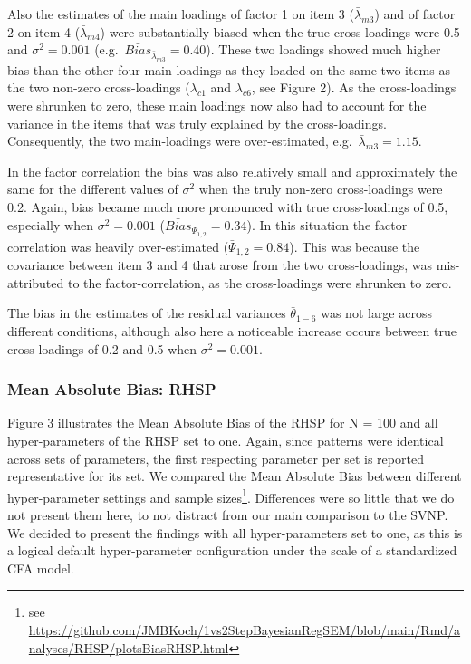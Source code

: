 \documentclass[
  english,
  man, donotrepeattitle,floatsintext]{apa6}
\begin{document}
Also the estimates of the main loadings of factor 1 on item 3 (\(\bar{\lambda}_{m 3}\)) and of factor 2 on item 4 (\(\bar{\lambda}_{m 4}\)) were substantially biased when the true cross-loadings were 0.5 and \(\sigma^2 = 0.001\) (e.g.~\(\bar{Bias}_{\bar{\lambda}_{m 3}} = 0.40\)). These two loadings showed much higher bias than the other four main-loadings as they loaded on the same two items as the two non-zero cross-loadings (\(\bar{\lambda}_{c 1}\) and \(\bar{\lambda}_{c 6}\), see Figure 2). As the cross-loadings were shrunken to zero, these main loadings now also had to account for the variance in the items that was truly explained by the cross-loadings. Consequently, the two main-loadings were over-estimated, e.g.~\(\bar{\lambda}_{m 3} = 1.15\).

In the factor correlation the bias was also relatively small and approximately the same for the different values of \(\sigma^2\) when the truly non-zero cross-loadings were 0.2. Again, bias became much more pronounced with true cross-loadings of 0.5, especially when \(\sigma^2 = 0.001\) (\(\bar{Bias}_{\bar{\Psi}_{1,2}} = 0.34\)). In this situation the factor correlation was heavily over-estimated (\(\bar{\Psi}_{1,2} = 0.84\)). This was because the covariance between item 3 and 4 that arose from the two cross-loadings, was mis-attributed to the factor-correlation, as the cross-loadings were shrunken to zero.

The bias in the estimates of the residual variances \(\bar{\theta}_{1-6}\) was not large across different conditions, although also here a noticeable increase occurs between true cross-loadings of 0.2 and 0.5 when \(\sigma^2 = 0.001\).

\hypertarget{mean-absolute-bias-rhsp}{%
\subsubsection{Mean Absolute Bias: RHSP}\label{mean-absolute-bias-rhsp}}

Figure 3 illustrates the Mean Absolute Bias of the RHSP for N = 100 and all hyper-parameters of the RHSP set to one. Again, since patterns were identical across sets of parameters, the first respecting parameter per set is reported representative for its set. We compared the Mean Absolute Bias between different hyper-parameter settings and sample sizes\footnote{see \url{https://github.com/JMBKoch/1vs2StepBayesianRegSEM/blob/main/Rmd/analyses/RHSP/plotsBiasRHSP.html}}. Differences were so little that we do not present them here, to not distract from our main comparison to the SVNP. We decided to present the findings with all hyper-parameters set to one, as this is a logical default hyper-parameter configuration under the scale of a standardized CFA model.
\end{document}
